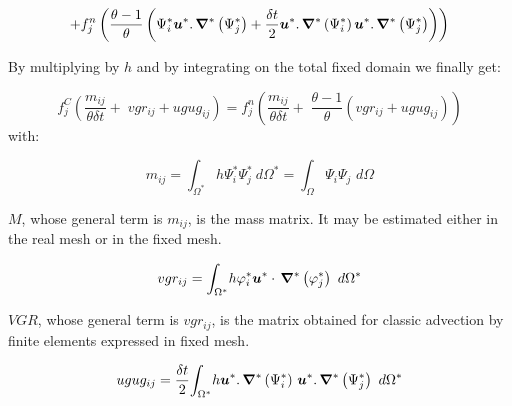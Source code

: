 \begin{equation}
+f_{j}^{n}\left(  \dfrac{\theta-1}{\theta}\left(  \Psi_{i}^{\ast}%
\vec{u}^{\ast}.\,\Grad^{\ast}\left(  \Psi_{j}%
^{\ast}\right)  +\dfrac{\delta t}{2}\vec{u}^{\ast}.\,\Grad%
^{\ast}\left(  \Psi_{i}^{\ast}\right)  \vec{u}^{\ast}%
.\,\Grad^{\ast}\left(  \Psi_{j}^{\ast}\right)  \right)
\right)
\end{equation}

By multiplying by $h$ and by integrating on the total fixed domain we finally get:%

\begin{equation}
f_{j}^{C}\left(  \dfrac{m_{ij}}{\theta\delta t}+\;vgr_{ij}+ugug_{ij}\right)
=f_{j}^{n}\left(  \dfrac{m_{ij}}{\theta\delta t}+\;\dfrac{\theta-1}{\theta
}\left(  vgr_{ij}+ugug_{ij}\right)  \right)
\end{equation}
with:%

\begin{equation}
m_{ij}=
{\displaystyle\int\nolimits_{\Omega^{\ast}}}
h\Psi_{i}^{\ast}\Psi_{j}^{\ast}~d\Omega^{\ast}=%
{\displaystyle\int\nolimits_{\Omega}}
\Psi_{i}\Psi_{j\,}~d\Omega
\end{equation}

$M$, whose general term is $m_{ij}$, is the mass matrix. It may be estimated
either in the real mesh or in the fixed mesh.%

\begin{equation}
vgr_{ij}=%
{\displaystyle\int\nolimits_{\Omega^{\ast}}}
h\varphi_{i}^{\ast}\vec{u}^{\ast}\cdot\,\Grad^{\ast}\left(
\varphi_{j}^{\ast}\right)  ~d\Omega^{\ast}%
\end{equation}


$VGR$, whose general term is $vgr_{ij}$, is the matrix obtained for classic
advection by finite elements expressed in fixed mesh.%

\begin{equation}
ugug_{ij}=\dfrac{\delta t}{2}%
{\displaystyle\int\nolimits_{\Omega^{\ast}}}
h\vec{u}^{\ast}.\,\Grad^{\ast}\left(  \Psi_{i}^{\ast}\right)
\,\vec{u}^{\ast}.\,\Grad^{\ast}\left(  \Psi
_{j}^{\ast}\right)  ~d\Omega^{\ast}%
\end{equation}


